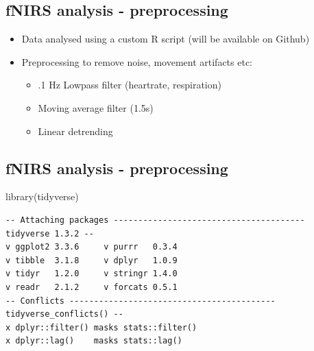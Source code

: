 \documentclass[
  letterpaper,
  DIV=11,
  numbers=noendperiod]{scrartcl}
\newenvironment{Shaded}{\begin{snugshade}}{\end{snugshade}}
\newcommand{\FunctionTok}[1]{\textcolor[rgb]{0.28,0.35,0.67}{#1}}
\newcommand{\NormalTok}[1]{\textcolor[rgb]{0.00,0.23,0.31}{#1}}
\begin{document}
\hypertarget{fnirs-analysis---preprocessing}{%
\subsection{fNIRS analysis -
preprocessing}\label{fnirs-analysis---preprocessing}}

\begin{itemize}
\item
  Data analysed using a custom R script (will be available on Github)
\item
  Preprocessing to remove noise, movement artifacts etc:

  \begin{itemize}
  \item
    .1 Hz Lowpass filter (heartrate, respiration)
  \item
    Moving average filter (1.5s)
  \item
    Linear detrending
  \end{itemize}
\end{itemize}

\hypertarget{fnirs-analysis---preprocessing-1}{%
\subsection{fNIRS analysis -
preprocessing}\label{fnirs-analysis---preprocessing-1}}

\begin{Shaded}
\begin{Highlighting}[]
\FunctionTok{library}\NormalTok{(tidyverse)}
\end{Highlighting}
\end{Shaded}

\begin{verbatim}
-- Attaching packages --------------------------------------- tidyverse 1.3.2 --
v ggplot2 3.3.6     v purrr   0.3.4
v tibble  3.1.8     v dplyr   1.0.9
v tidyr   1.2.0     v stringr 1.4.0
v readr   2.1.2     v forcats 0.5.1
-- Conflicts ------------------------------------------ tidyverse_conflicts() --
x dplyr::filter() masks stats::filter()
x dplyr::lag()    masks stats::lag()
\end{verbatim}
\end{document}
